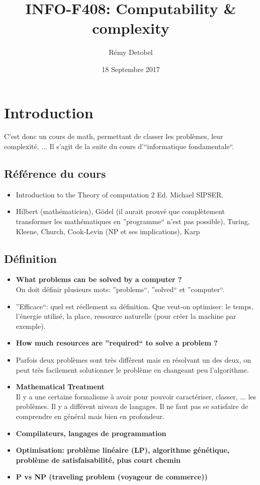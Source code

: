 \documentclass[a4paper,12pt]{article}
\title{INFO-F408: Computability \& complexity}
\author{Rémy Detobel}
\date{18 Septembre 2017}
\begin{document}
\maketitle
\newpage

\section{Introduction}
  C'est donc un cours de math, permettant de classer les problèmes, leur complexité, ... Il s'agit de la suite du cours d'``informatique fondamentale``.

  \subsection{Référence du cours}
    \begin{itemize}
      \item Introduction to the Theory of computation 2 Ed.  Michael SIPSER.
      \item Hilbert (mathématicien), Gödel (il aurait prouvé que complètement transformer les mathématiques en ''programme`` n'est pas possible), Turing, Kleene, Church, Cook-Levin (NP et ses implications), Karp
    \end{itemize}

  \subsection{Définition}
    \begin{itemize}
      \item \textbf{What problems can be solved by a computer ?}\\
	  On doit définir plusieurs mots: ''problems``, ''solved`` et ''computer``.
      \item ''Efficace``: quel est réellement sa définition.  Que veut-on optimiser: le temps, l'énergie utilisé, la place, ressource naturelle (pour créer la machine par exemple).
      \item \textbf{How much resources are ''required`` to solve a problem ?}
      \item Parfois deux problèmes sont très différent mais en résolvant un des deux, on peut très facilement solutionner le problème en changeant peu l'algorithme.
      \item \textbf{Mathematical Treatment}\\
	Il y a une certaine formalisme à avoir pour pouvoir caractériser, classer, ... les problèmes.  Il y a différent niveau de langages.  Il ne faut pas se satisfaire de comprendre en général mais bien en profondeur.
      \item \textbf{Compilateurs, langages de programmation}
      \item \textbf{Optimisation: problème linéaire (LP), algorithme génétique, problème de satisfaisabilité, plus court chemin}
      \item \textbf{P vs NP (traveling problem (voyageur de commerce))}
    \end{itemize}
\end{document}
